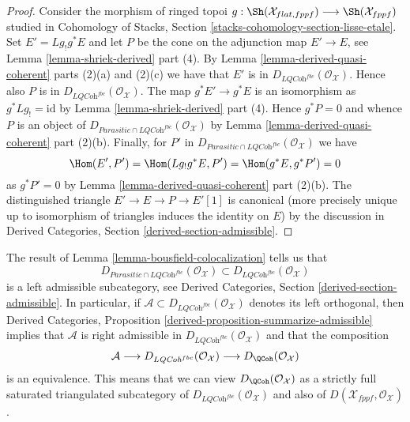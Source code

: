 \begin{proof}
Consider the morphism of ringed topoi
$g : \Sh(\mathcal{X}_{flat, fppf}) \longrightarrow \Sh(\mathcal{X}_{fppf})$
studied in Cohomology of Stacks, Section
\ref{stacks-cohomology-section-lisse-etale}.
Set $E' = Lg_!g^*E$ and let $P$ be the cone on the adjunction
map $E' \to E$, see Lemma \ref{lemma-shriek-derived} part (4).
By Lemma \ref{lemma-derived-quasi-coherent} parts (2)(a) and (2)(c)
we have that $E'$ is in $D_{\textit{LQCoh}^{fbc}}(\mathcal{O}_\mathcal{X})$.
Hence also $P$ is in $D_{\textit{LQCoh}^{fbc}}(\mathcal{O}_\mathcal{X})$.
The map $g^*E' \to g^*E$ is an isomorphism as $g^*Lg_! = \text{id}$ by
Lemma \ref{lemma-shriek-derived} part (4).
Hence $g^*P = 0$ and whence $P$ is an object of
$D_{\textit{Parasitic} \cap \textit{LQCoh}^{fbc}}(\mathcal{O}_\mathcal{X})$ by
Lemma \ref{lemma-derived-quasi-coherent} part (2)(b).
Finally, for $P'$ in
$D_{\textit{Parasitic} \cap \textit{LQCoh}^{fbc}}(\mathcal{O}_\mathcal{X})$
we have
$$
\Hom(E', P') = \Hom(Lg_!g^*E, P') = \Hom(g^*E, g^*P') = 0
$$
as $g^*P' = 0$ by Lemma \ref{lemma-derived-quasi-coherent} part (2)(b).
The distinguished triangle $E' \to E \to P \to E'[1]$ is canonical
(more precisely unique up to isomorphism of triangles induces the
identity on $E$) by the discussion in Derived Categories, Section
\ref{derived-section-admissible}.
\end{proof}

\begin{remark}
\label{remark-QCoh-admissible}
The result of Lemma \ref{lemma-bousfield-colocalization} tells us that
$$
D_{\textit{Parasitic} \cap \textit{LQCoh}^{fbc}}(\mathcal{O}_\mathcal{X})
\subset
D_{\textit{LQCoh}^{fbc}}(\mathcal{O}_\mathcal{X})
$$
is a left admissible subcategory, see
Derived Categories, Section \ref{derived-section-admissible}.
In particular, if
$\mathcal{A} \subset D_{\textit{LQCoh}^{fbc}}(\mathcal{O}_\mathcal{X})$
denotes its left orthogonal, then Derived Categories, Proposition
\ref{derived-proposition-summarize-admissible}
implies that $\mathcal{A}$ is right admissible in
$D_{\textit{LQCoh}^{fbc}}(\mathcal{O}_\mathcal{X})$ and that
the composition
$$
\mathcal{A} \longrightarrow
D_{\textit{LQCoh}^{fbc}}(\mathcal{O}_\mathcal{X}) \longrightarrow
D_\QCoh(\mathcal{O}_\mathcal{X})
$$
is an equivalence. This means that we can view
$D_\QCoh(\mathcal{O}_\mathcal{X})$ as a strictly full saturated
triangulated subcategory of $D_{\textit{LQCoh}^{fbc}}(\mathcal{O}_\mathcal{X})$
and also of $D(\mathcal{X}_{fppf}, \mathcal{O}_\mathcal{X})$.
\end{remark}





